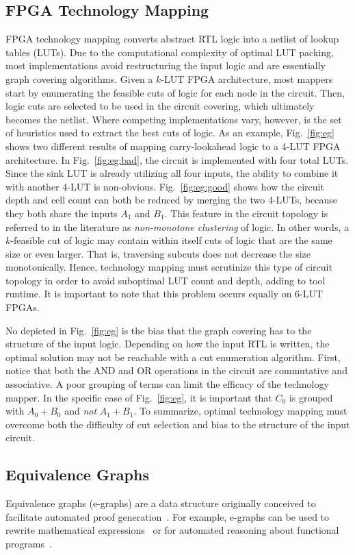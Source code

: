 \subsection{FPGA Technology Mapping}\label{sec:background:fpga}
FPGA technology mapping converts abstract RTL logic into a netlist of lookup
tables (LUTs). Due to the computational complexity of optimal LUT packing, most
implementations avoid restructuring the input logic and are essentially graph
covering algorithms. Given a $k$-LUT FPGA architecture, most mappers start by
enumerating the feasible cuts of logic for each node in the circuit. Then,
logic cuts are selected to be used in the circuit covering, which ultimately
becomes the netlist. Where competing implementations vary, however, is the set
of heuristics used to extract the best cuts of logic. As an example,
Fig.~\ref{fig:eg} shows two different results of mapping carry-lookahead logic
to a 4-LUT FPGA architecture. In Fig.~\ref{fig:eg:bad}, the circuit is
implemented with four total LUTs. Since the sink LUT is already utilizing all
four inputs, the ability to combine it with another 4-LUT is non-obvious.
Fig.~\ref{fig:eg:good} shows how the circuit depth and cell count can both be
reduced by merging the two 4-LUTs, because they both share the inputs $A_1$ and
$B_1$. This feature in the circuit topology is referred to in the literature as
\textit{non-monotone clustering} of logic. In other words, a $k$-feasible cut
of logic may contain within itself cuts of logic that are the same size or even
larger. That is, traversing subcuts does not decrease the size monotonically.
Hence, technology mapping must scrutinize this type of circuit topology in
order to avoid suboptimal LUT count and depth, adding to tool runtime. It is
important to note that this problem occurs equally on 6-LUT FPGAs.

No depicted in Fig.~\ref{fig:eg} is the bias that the graph covering has to the
structure of the input logic. Depending on how the input RTL is written, the
optimal solution may not be reachable with a cut enumeration algorithm. First,
notice that both the AND and OR operations in the circuit are commutative and
associative. A poor grouping of terms can limit the efficacy of the technology
mapper. In the specific case of Fig.~\ref{fig:eg}, it is important that $C_0$
is grouped with $A_0 + B_0$ and \textit{not} $A_1 + B_1$. To summarize, optimal
technology mapping must overcome both the difficulty of cut selection and bias
to the structure of the input circuit.

\subsection{Equivalence Graphs}\label{sec:background:egraph}
Equivalence graphs (e-graphs) are a data structure originally conceived to
facilitate automated proof generation~\cite{eggpaper, eqsat}. For example,
e-graphs can be used to rewrite mathematical expressions~\cite{egraphmath} or
for automated reasoning about functional programs~\cite{cclemma}.

